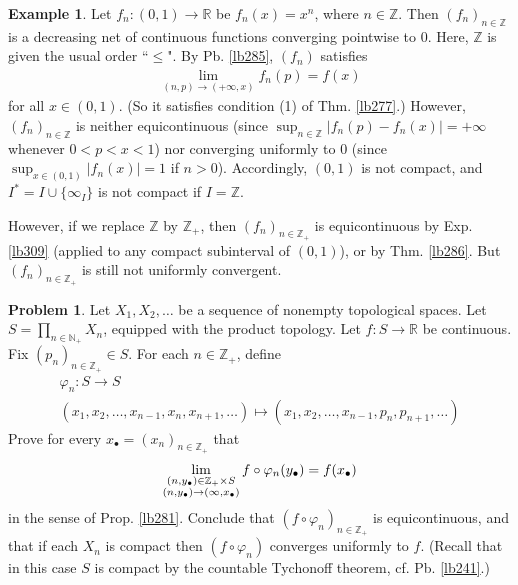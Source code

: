 \documentclass[12pt,b5paper,notitlepage]{article}
\theoremstyle{definition}
\newtheorem{eg}[df]{Example}
\newtheorem{prob}{\color{red}Problem}[section]
\theoremstyle{plain}
\newcommand{\blt}{\bullet}
\newcommand{\Nbb}{\mathbb N}
\newcommand{\Zbb}{\mathbb Z}
\newcommand{\Rbb}{\mathbb R}
\numberwithin{equation}{section}
\begin{document}
\begin{eg}\label{lb401}
Let $f_n:(0,1)\rightarrow \Rbb$ be $f_n(x)=x^n$, where $n\in\Zbb$. Then $(f_n)_{n\in\Zbb}$ is a decreasing net of continuous functions converging pointwise to $0$. Here, $\Zbb$ is given the usual order ``$\leq$". By Pb. \ref{lb285}, $(f_n)$ satisfies
\begin{align*}
\lim_{(n,p)\rightarrow(+\infty,x)
}f_n(p)=f(x)
\end{align*}
for all $x\in (0,1)$. (So it satisfies condition (1) of Thm. \ref{lb277}.) However, $(f_n)_{n\in\Zbb}$ is neither equicontinuous (since $\sup_{n\in\Zbb}|f_n(p)-f_n(x)|=+\infty$ whenever $0<p<x<1$) nor converging uniformly to $0$ (since $\sup_{x\in (0,1)}|f_n(x)|=1$ if $n>0$). Accordingly, $(0,1)$ is not compact, and $I^*=I\cup\{\infty_I\}$ is not compact if $I=\Zbb$. 

However, if we replace $\Zbb$ by $\Zbb_+$, then $(f_n)_{n\in\Zbb_+}$ is equicontinuous by Exp. \ref{lb309} (applied to any compact subinterval of $(0,1)$), or by Thm. \ref{lb286}. But $(f_n)_{n\in\Zbb_+}$ is still not uniformly convergent. 
 \hfill\qedsymbol
\end{eg}


\begin{prob}\label{lb453}
Let $X_1,X_2,\dots$ be a sequence of nonempty topological spaces. Let $S=\prod_{n\in\Nbb_+}X_n$, equipped with the product topology. Let $f: S \rightarrow \mathbb{R}$ be continuous. Fix $\left(p_n\right)_{n \in \mathbb{Z}_{+}} \in S$. For each $n \in \mathbb{Z}_{+}$, define
\begin{gather*}
\varphi_n : S \rightarrow S \\
\left(x_1, x_2, \ldots, x_{n-1}, x_n, x_{n+1}, \ldots\right)  \mapsto\left(x_1, x_2, \ldots, x_{n-1}, p_n, p_{n+1}, \ldots\right)
\end{gather*}
Prove for every $x_\blt=(x_n)_{n\in\Zbb_+}$ that
\begin{align*}
\lim_{
\begin{subarray}{c}
(n,y_\blt)\in \Zbb_+\times S\\
(n,y_\blt)\rightarrow(\infty,x_\blt)
\end{subarray}
}f\circ\varphi_n(y_\blt)=f(x_\blt)
\end{align*}
in the sense of Prop. \ref{lb281}. Conclude that $(f\circ\varphi_n)_{n\in\Zbb_+}$ is equicontinuous, and that if each $X_n$ is compact then $(f\circ\varphi_n)$ converges uniformly to $f$. (Recall that in this case $S$ is compact by the countable Tychonoff theorem, cf. Pb. \ref{lb241}.)
\end{prob}
\end{document}
